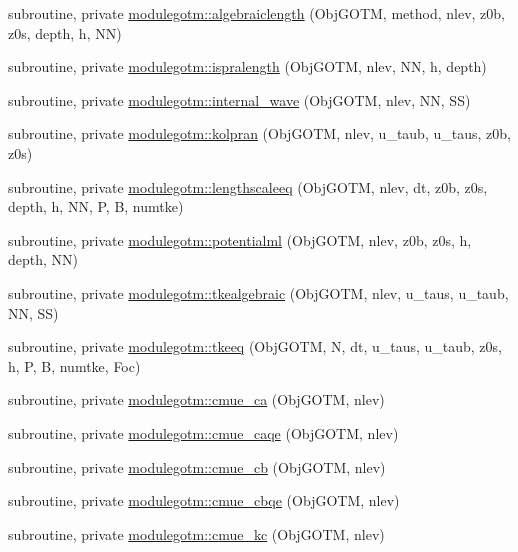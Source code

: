\begin{DoxyCompactItemize}
subroutine, private \mbox{\hyperlink{namespacemodulegotm_a91db88191066626042c7b8aba8a116ab}{modulegotm\+::algebraiclength}} (Obj\+G\+O\+TM, method, nlev, z0b, z0s, depth, h, NN)
\item 
subroutine, private \mbox{\hyperlink{namespacemodulegotm_a8afda9608a508419c6574b11765db424}{modulegotm\+::ispralength}} (Obj\+G\+O\+TM, nlev, NN, h, depth)
\item 
subroutine, private \mbox{\hyperlink{namespacemodulegotm_a4287a5fde4824d73e35ee66bf90b5f3b}{modulegotm\+::internal\+\_\+wave}} (Obj\+G\+O\+TM, nlev, NN, SS)
\item 
subroutine, private \mbox{\hyperlink{namespacemodulegotm_a41a284016e83d9fe85740b08ed8abdc2}{modulegotm\+::kolpran}} (Obj\+G\+O\+TM, nlev, u\+\_\+taub, u\+\_\+taus, z0b, z0s)
\item 
subroutine, private \mbox{\hyperlink{namespacemodulegotm_a82edc4e2eec49fb4f24fc31918908aef}{modulegotm\+::lengthscaleeq}} (Obj\+G\+O\+TM, nlev, dt, z0b, z0s, depth, h, NN, P, B, numtke)
\item 
subroutine, private \mbox{\hyperlink{namespacemodulegotm_a2ac21e06e59e99b089466cd065b15ca3}{modulegotm\+::potentialml}} (Obj\+G\+O\+TM, nlev, z0b, z0s, h, depth, NN)
\item 
subroutine, private \mbox{\hyperlink{namespacemodulegotm_afc07b47188fabbcdd572769fce2e7e97}{modulegotm\+::tkealgebraic}} (Obj\+G\+O\+TM, nlev, u\+\_\+taus, u\+\_\+taub, NN, SS)
\item 
subroutine, private \mbox{\hyperlink{namespacemodulegotm_aa2677c2275ef6e84a615765d4db0772c}{modulegotm\+::tkeeq}} (Obj\+G\+O\+TM, N, dt, u\+\_\+taus, u\+\_\+taub, z0s, h, P, B, numtke, Foc)
\item 
subroutine, private \mbox{\hyperlink{namespacemodulegotm_a8f3eabf069e4530d9ca2df0e3228c074}{modulegotm\+::cmue\+\_\+ca}} (Obj\+G\+O\+TM, nlev)
\item 
subroutine, private \mbox{\hyperlink{namespacemodulegotm_a38a0c42b81c2a8bae8ae60d20ed0df23}{modulegotm\+::cmue\+\_\+caqe}} (Obj\+G\+O\+TM, nlev)
\item 
subroutine, private \mbox{\hyperlink{namespacemodulegotm_a2b38e80c2393abb45f25640cd3fda481}{modulegotm\+::cmue\+\_\+cb}} (Obj\+G\+O\+TM, nlev)
\item 
subroutine, private \mbox{\hyperlink{namespacemodulegotm_ab183ae0777bf5a1d3c5b4ebbb9c2b9b5}{modulegotm\+::cmue\+\_\+cbqe}} (Obj\+G\+O\+TM, nlev)
\item 
subroutine, private \mbox{\hyperlink{namespacemodulegotm_a39841630271ec0cdc9e21a9bc1bfc289}{modulegotm\+::cmue\+\_\+kc}} (Obj\+G\+O\+TM, nlev)

\end{DoxyCompactItemize}
